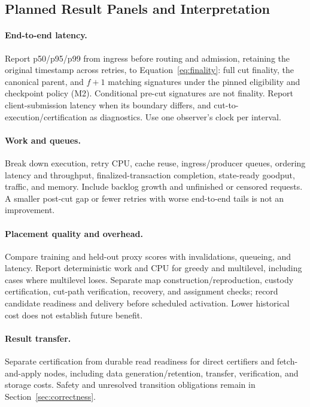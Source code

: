 \subsection{Planned Result Panels and Interpretation}

\paragraph{End-to-end latency.}
Report p50/p95/p99 from ingress before routing and admission, retaining the original timestamp across retries, to Equation~\ref{eq:finality}: full cut finality, the canonical parent, and \(f+1\) matching signatures under the pinned eligibility and checkpoint policy (M2). Conditional pre-cut signatures are not finality. Report client-submission latency when its boundary differs, and cut-to-execution/certification as diagnostics. Use one observer's clock per interval.

\paragraph{Work and queues.}
Break down execution, retry CPU, cache reuse, ingress/producer queues, ordering latency and throughput, finalized-transaction completion, state-ready goodput, traffic, and memory. Include backlog growth and unfinished or censored requests. A smaller post-cut gap or fewer retries with worse end-to-end tails is not an improvement.

\paragraph{Placement quality and overhead.}
Compare training and held-out proxy scores with invalidations, queueing, and latency. Report deterministic work and CPU for greedy and multilevel, including cases where multilevel loses. Separate map construction/reproduction, custody certification, cut-path verification, recovery, and assignment checks; record candidate readiness and delivery before scheduled activation. Lower historical cost does not establish future benefit.

\paragraph{Result transfer.}
Separate certification from durable read readiness for direct certifiers and fetch-and-apply nodes, including data generation/retention, transfer, verification, and storage costs. Safety and unresolved transition obligations remain in Section~\ref{sec:correctness}.

